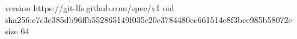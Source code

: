version https://git-lfs.github.com/spec/v1
oid sha256:c7c3e385db96ffb552865149f035c20c3784480ec661514e8f3bce985b58072e
size 64
